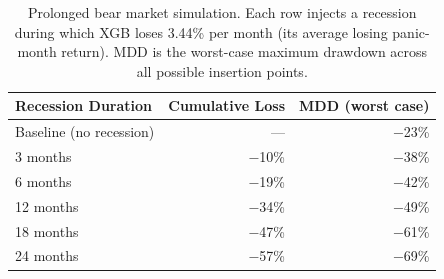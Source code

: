 \begin{table}[H]
\centering
\small
\begin{tabular}{l r r}
\toprule
Recession Duration & Cumulative Loss & MDD (worst case) \\
\midrule
Baseline (no recession) & --- & $-$23\% \\
3 months & $-$10\% & $-$38\% \\
6 months & $-$19\% & $-$42\% \\
12 months & $-$34\% & $-$49\% \\
18 months & $-$47\% & $-$61\% \\
24 months & $-$57\% & $-$69\% \\
\bottomrule
\end{tabular}
\caption{Prolonged bear market simulation. Each row injects a recession during which XGB loses 3.44\% per month (its average losing panic-month return). MDD is the worst-case maximum drawdown across all possible insertion points.}
\label{tab:stress_scenarios}
\end{table}
